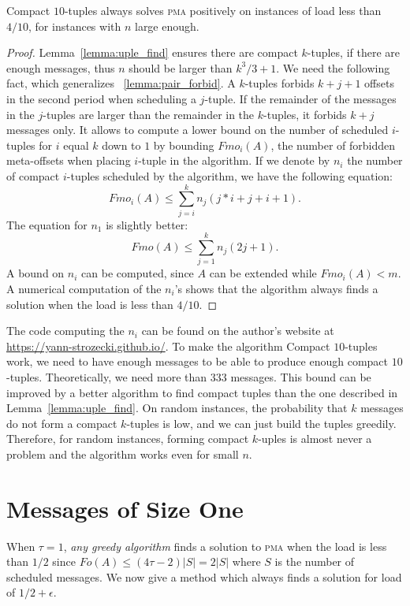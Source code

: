 \documentclass[a4paper,UKenglish,cleveref, autoref, thm-restate]{lipics-v2019}
\newcommand\pma{\textsc{pma}\xspace}
\begin{document}
\begin{theorem}
Compact $10$-tuples always solves \pma positively on instances of load less than $4/10$, for instances with $n$ large enough.
\end{theorem}
\begin{proof}
Lemma~\ref{lemma:uple_find} ensures there are compact $k$-tuples, if there are enough messages,
thus $n$ should be larger than $k^3/3 +1$. 
We need the following fact, which generalizes ~\ref{lemma:pair_forbid}. A $k$-tuples forbids $k+j+1$ offsets in the second period when scheduling a $j$-tuple. If the remainder of the messages in the $j$-tuples are larger than the remainder in the $k$-tuples, it forbids $k+j$ messages only.
It allows to compute a lower bound on the number of scheduled $i$-tuples for $i$ equal $k$ down to $1$ by bounding $Fmo_i(A)$, the number of forbidden meta-offsets when placing $i$-tuple in the algorithm.
If we denote by $n_i$ the number of compact $i$-tuples scheduled by the algorithm,
we have the following equation:  $$ Fmo_i(A) \leq \displaystyle{\sum_{j=i}^k n_j(j*i + j + i+ 1)}.$$
The equation for $n_1$ is slightly better: 
$$ Fmo(A) \leq \displaystyle{\sum_{j=1}^k n_j(2j + 1)}.$$
A bound on $n_i$ can be computed, since $A$ can be extended while $Fmo_i(A) < m$. A numerical computation of the $n_i$'s shows that the algorithm always finds a solution when the load is less than $4/10$.
\end{proof}

The code computing the $n_i$ can be found on the author's website at \url{https://yann-strozecki.github.io/}.
To make the algorithm Compact $10$-tuples work, we need to have enough messages to be able to
produce enough compact $10$-tuples. Theoretically, we need more than $333$ messages. This bound can be improved
by a better algorithm to find compact tuples than the one described in Lemma~\ref{lemma:uple_find}. On random instances, the probability that $k$ messages do not form a compact $k$-tuples is low, and we can just build the tuples greedily. Therefore, for random instances, forming compact $k$-uples is almost never a problem and the algorithm works even for small $n$.
 


\section{Messages of Size One} \label{sec:small}

When $\tau = 1$, \emph{any greedy algorithm} finds a solution to \pma when the load is less than $1/2$ since $Fo(A) \leq (4\tau -2)|S| = 2|S|$ where $S$ is the number of scheduled messages. We now give a method which always finds a solution for load of $1/2 + \epsilon$.
\end{document}
